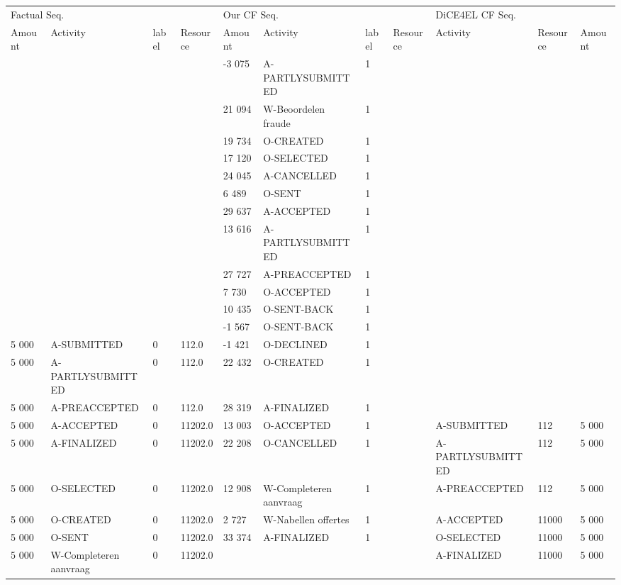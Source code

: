 \begin{tabular}{lllllllllll}
\toprule
\multicolumn{4}{l}{Factual Seq.} & \multicolumn{4}{l}{Our CF Seq.} & \multicolumn{3}{l}{DiCE4EL CF Seq.} \\
Amount & Activity & label & Resource & Amount & Activity & label & Resource & Activity & Resource & Amount \\
\midrule
 &  &  &  & -3 075 & A-PARTLYSUBMITTED & 1 &  &  &  &  \\
 &  &  &  & 21 094 & W-Beoordelen fraude & 1 &  &  &  &  \\
 &  &  &  & 19 734 & O-CREATED & 1 &  &  &  &  \\
 &  &  &  & 17 120 & O-SELECTED & 1 &  &  &  &  \\
 &  &  &  & 24 045 & A-CANCELLED & 1 &  &  &  &  \\
 &  &  &  & 6 489 & O-SENT & 1 &  &  &  &  \\
 &  &  &  & 29 637 & A-ACCEPTED & 1 &  &  &  &  \\
 &  &  &  & 13 616 & A-PARTLYSUBMITTED & 1 &  &  &  &  \\
 &  &  &  & 27 727 & A-PREACCEPTED & 1 &  &  &  &  \\
 &  &  &  & 7 730 & O-ACCEPTED & 1 &  &  &  &  \\
 &  &  &  & 10 435 & O-SENT-BACK & 1 &  &  &  &  \\
 &  &  &  & -1 567 & O-SENT-BACK & 1 &  &  &  &  \\
5 000 & A-SUBMITTED & 0 & 112.0 & -1 421 & O-DECLINED & 1 &  &  &  &  \\
5 000 & A-PARTLYSUBMITTED & 0 & 112.0 & 22 432 & O-CREATED & 1 &  &  &  &  \\
5 000 & A-PREACCEPTED & 0 & 112.0 & 28 319 & A-FINALIZED & 1 &  &  &  &  \\
5 000 & A-ACCEPTED & 0 & 11202.0 & 13 003 & O-ACCEPTED & 1 &  & A-SUBMITTED & 112 & 5 000 \\
5 000 & A-FINALIZED & 0 & 11202.0 & 22 208 & O-CANCELLED & 1 &  & A-PARTLYSUBMITTED & 112 & 5 000 \\
5 000 & O-SELECTED & 0 & 11202.0 & 12 908 & W-Completeren aanvraag & 1 &  & A-PREACCEPTED & 112 & 5 000 \\
5 000 & O-CREATED & 0 & 11202.0 & 2 727 & W-Nabellen offertes & 1 &  & A-ACCEPTED & 11000 & 5 000 \\
5 000 & O-SENT & 0 & 11202.0 & 33 374 & A-FINALIZED & 1 &  & O-SELECTED & 11000 & 5 000 \\
5 000 & W-Completeren aanvraag & 0 & 11202.0 &  &  &  &  & A-FINALIZED & 11000 & 5 000 \\

\end{tabular}
